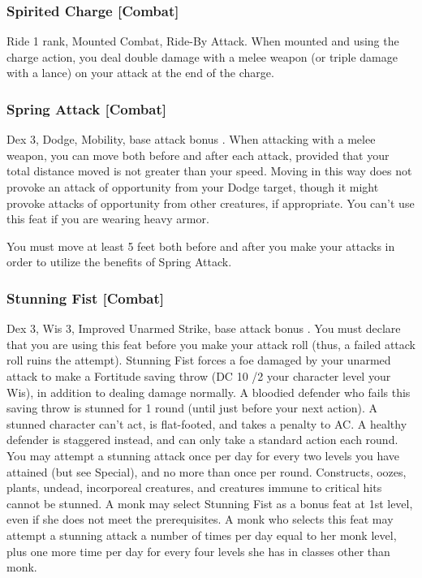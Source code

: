 \subsubsection{Spirited Charge [Combat]}
 Ride 1 rank, Mounted Combat, Ride-By Attack.
 When mounted and using the charge action, you deal double damage with a melee weapon (or triple damage with a lance) on your attack at the end of the charge.%

\subsubsection{Spring Attack [Combat]}
 Dex 3, Dodge, Mobility, base attack bonus .
 When attacking with a melee weapon, you can move both before and after each attack, provided that your total distance moved is not greater than your speed. Moving in this way does not provoke an attack of opportunity from your Dodge target, though it might provoke attacks of opportunity from other creatures, if appropriate. You can't use this feat if you are wearing heavy armor.
\par You must move at least 5 feet both before and after you make your attacks in order to utilize the benefits of Spring Attack.%

\subsubsection{Stunning Fist [Combat]}
 Dex 3, Wis 3, Improved Unarmed Strike, base attack bonus .
 You must declare that you are using this feat before you make your attack roll (thus, a failed attack roll ruins the attempt). Stunning Fist forces a foe damaged by your unarmed attack to make a Fortitude saving throw (DC 10 /2 your character level \add your Wis), in addition to dealing damage normally. A bloodied defender who fails this saving throw is stunned for 1 round (until just before your next action). A stunned character can't act, is flat-footed, and takes a  penalty to AC. A healthy defender is staggered instead, and can only take a standard action each round. You may attempt a stunning attack once per day for every two levels you have attained (but see Special), and no more than once per round. Constructs, oozes, plants, undead, incorporeal creatures, and creatures immune to critical hits cannot be stunned.
 A monk may select Stunning Fist as a bonus feat at 1st level, even if she does not meet the prerequisites. A monk who selects this feat may attempt a stunning attack a number of times per day equal to her monk level, plus one more time per day for every four levels she has in classes other than monk.

